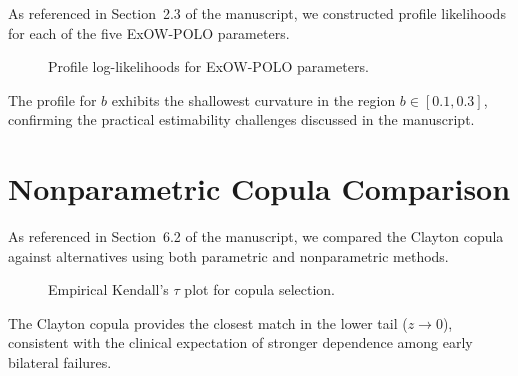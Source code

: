 \documentclass[12pt,a4paper]{article}
\begin{document}
As referenced in Section~2.3 of the manuscript, we constructed profile likelihoods for each of the five ExOW-POLO parameters.

\begin{figure}[H]
\centering
{}
\caption{Profile log-likelihoods for ExOW-POLO parameters.}
\label{fig:S3}
\end{figure}

The profile for $b$ exhibits the shallowest curvature in the region $b \in [0.1, 0.3]$, confirming the practical estimability challenges discussed in the manuscript.

\section{Nonparametric Copula Comparison}

As referenced in Section~6.2 of the manuscript, we compared the Clayton copula against alternatives using both parametric and nonparametric methods.

\begin{figure}[H]
\centering
{}
\caption{Empirical Kendall's $\tau$ plot for copula selection.}
\label{fig:S4}
\end{figure}

The Clayton copula provides the closest match in the lower tail ($z \to 0$), consistent with the clinical expectation of stronger dependence among early bilateral failures.
\end{document}
